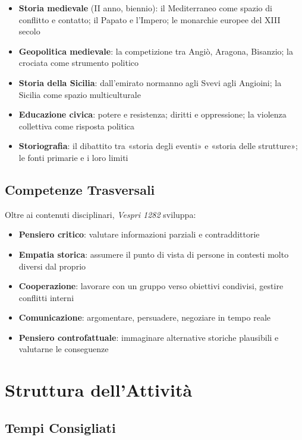 \begin{itemize}
  \item \textbf{Storia medievale} (II anno, biennio): il Mediterraneo
    come spazio di conflitto e contatto; il Papato e l'Impero;
    le monarchie europee del XIII secolo
  \item \textbf{Geopolitica medievale}: la competizione tra Angiò,
    Aragona, Bisanzio; la crociata come strumento politico
  \item \textbf{Storia della Sicilia}: dall'emirato normanno
    agli Svevi agli Angioini; la Sicilia come spazio multiculturale
  \item \textbf{Educazione civica}: potere e resistenza; diritti
    e oppressione; la violenza collettiva come risposta politica
  \item \textbf{Storiografia}: il dibattito tra «storia degli
    eventi» e «storia delle strutture»; le fonti primarie
    e i loro limiti
\end{itemize}

\subsection{Competenze Trasversali}

Oltre ai contenuti disciplinari, \textit{Vespri 1282} sviluppa:

\begin{itemize}
  \item \textbf{Pensiero critico}: valutare informazioni
    parziali e contraddittorie
  \item \textbf{Empatia storica}: assumere il punto di vista
    di persone in contesti molto diversi dal proprio
  \item \textbf{Cooperazione}: lavorare con un gruppo verso
    obiettivi condivisi, gestire conflitti interni
  \item \textbf{Comunicazione}: argomentare, persuadere,
    negoziare in tempo reale
  \item \textbf{Pensiero controfattuale}: immaginare alternative
    storiche plausibili e valutarne le conseguenze
\end{itemize}

\secsep

\section{Struttura dell'Attività}

\subsection{Tempi Consigliati}

